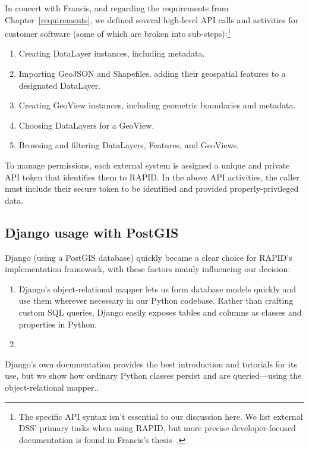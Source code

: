 In concert with Francis, and regarding the requirements from Chapter~\ref{requirements}, we defined several high-level API calls and activities for customer software (some of which are broken into sub-steps):\footnote{The specific API syntax isn't essential to our discussion here. We list external DSS' primary tasks when using RAPID, but more precise developer-focused documentation is found in Francis's thesis~\cite{Francis}.}


\begin{enumerate}
  \item Creating DataLayer instances, including metadata.
  \item Importing GeoJSON and Shapefiles, adding their geospatial features to a designated DataLayer.
  \item Creating GeoView instances, including geometric boundaries and metadata.
  \item Choosing DataLayers for a GeoView.
  \item Browsing and filtering DataLayers, Features, and GeoViews.
\end{enumerate}

To manage permissions, each external system is assigned a unique and private API token that identifies them to RAPID. In the above API activities, the caller must include their secure token to be identified and provided properly-privileged data.

\subsection{Django usage with PostGIS}
Django (using a PostGIS database) quickly became a clear choice for RAPID's implementation framework, with these factors mainly influencing our decision:

\begin{enumerate}
\item Django's object-relational mapper lets us form database models quickly and use them wherever necessary in our Python codebase. Rather than crafting custom SQL queries, Django easily exposes tables and columns as classes and properties in Python.
\item
\end{enumerate}


Django's own documentation provides the best introduction and tutorials for its use, but we show how ordinary Python classes persist and are queried---using the object-relational mapper..



